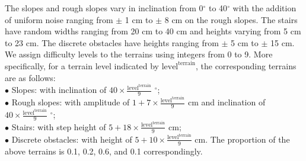 The slopes and rough slopes vary in inclination from 0$^{\circ}$ to 40$^{\circ}$ with the addition of uniform noise ranging from $\pm$ 1 cm to $\pm$ 8 cm on the rough slopes. The stairs have random widths ranging from 20 cm to 40 cm and heights varying from 5 cm to 23 cm. The discrete obstacles have heights ranging from $\pm$ 5 cm to $\pm$ 15 cm. We assign difficulty levels to the terrains using integers from 0 to 9. More specifically, for a terrain level indicated by $\text{level}^{\text{terrain}}$, the corresponding terrains are as follows: \\

$\bullet$ Slopes: with inclination of $40 \times \frac{\text{level}^{\text{terrain}}}{9}$ $^{\circ}$; \\
$\bullet$ Rough slopes: with amplitude of $1 + 7 \times \frac{\text{level}^{\text{terrain}}}{9}$ cm and inclination of $40 \times \frac{\text{level}^{\text{terrain}}}{9}$ $^{\circ}$; \\
$\bullet$ Stairs: with step height of $5 + 18 \times \frac{\text{level}^{\text{terrain}}}{9}$ cm; \\
$\bullet$ Discrete obstacles: with height of $5 + 10 \times \frac{\text{level}^{\text{terrain}}}{9}$ cm.
The proportion of the above terrains is 0.1, 0.2, 0.6, and 0.1 correspondingly.

